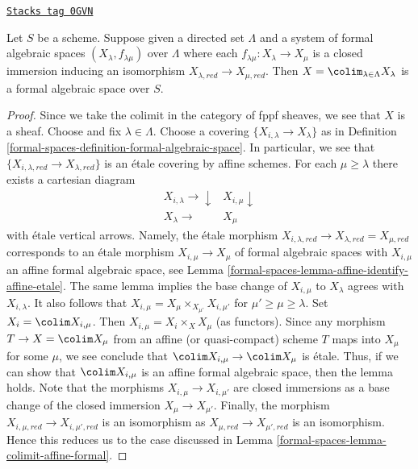 \begin{lemma}
\label{formal-spaces-lemma-colimit-formal-spaces-is-formal-space}
\href{https://stacks.math.columbia.edu/tag/0GVN}{\texttt{Stacks tag 0GVN}}

Let $S$ be a scheme. Suppose given a directed set
$\Lambda$ and a system of formal algebraic spaces
$(X_\lambda, f_{\lambda \mu})$ over $\Lambda$ where each
$f_{\lambda \mu} : X_\lambda \to X_\mu$ is a closed immersion
inducing an isomorphism $X_{\lambda, red} \to X_{\mu, red}$.
Then $X = \colim_{\lambda \in \Lambda} X_\lambda$
is a formal algebraic space over $S$.
\end{lemma}

\begin{proof}
Since we take the colimit in the category of fppf sheaves, we
see that $X$ is a sheaf. Choose and fix $\lambda \in \Lambda$. Choose
a covering $\{X_{i, \lambda} \to X_\lambda\}$ as in Definition
\ref{formal-spaces-definition-formal-algebraic-space}. In particular, we see
that $\{X_{i, \lambda, red} \to X_{\lambda, red}\}$ is an
\'etale covering by affine schemes.
For each $\mu \geq \lambda$ there exists a cartesian diagram
$$
\begin{array}{cc}X_{i, \lambda} \longrightarrow\downarrow & X_{i, \mu} \downarrow \\ X_\lambda \longrightarrow & X_\mu\end{array}
$$
with \'etale vertical arrows. Namely, the \'etale morphism
$X_{i, \lambda, red} \to X_{\lambda, red} = X_{\mu, red}$
corresponds to an \'etale morphism $X_{i, \mu} \to X_\mu$
of formal algebraic spaces with $X_{i, \mu}$ an affine formal
algebraic space, see
Lemma \ref{formal-spaces-lemma-affine-identify-affine-etale}.
The same lemma implies the base change of $X_{i, \mu}$ to $X_\lambda$
agrees with $X_{i, \lambda}$. It also follows that
$X_{i, \mu} = X_\mu \times_{X_{\mu'}} X_{i, \mu'}$ for
$\mu' \geq \mu \geq \lambda$. Set $X_i = \colim X_{i, \mu}$.
Then $X_{i, \mu} = X_i \times_X X_\mu$ (as functors).
Since any morphism $T \to X = \colim X_\mu$
from an affine (or quasi-compact) scheme $T$ maps into $X_\mu$
for some $\mu$, we see conclude that
$\colim X_{i, \mu} \to \colim X_\mu$ is \'etale.
Thus, if we can show that $\colim X_{i, \mu}$ is an affine formal
algebraic space, then the lemma holds.
Note that the morphisms $X_{i, \mu} \to X_{i, \mu'}$
are closed immersions as a base change of the closed immersion
$X_\mu \to X_{\mu'}$. Finally, the morphism
$X_{i, \mu, red} \to X_{i, \mu', red}$ is an isomorphism
as $X_{\mu, red} \to X_{\mu', red}$ is an isomorphism.
Hence this reduces us to the case discussed in
Lemma \ref{formal-spaces-lemma-colimit-affine-formal}.
\end{proof}

